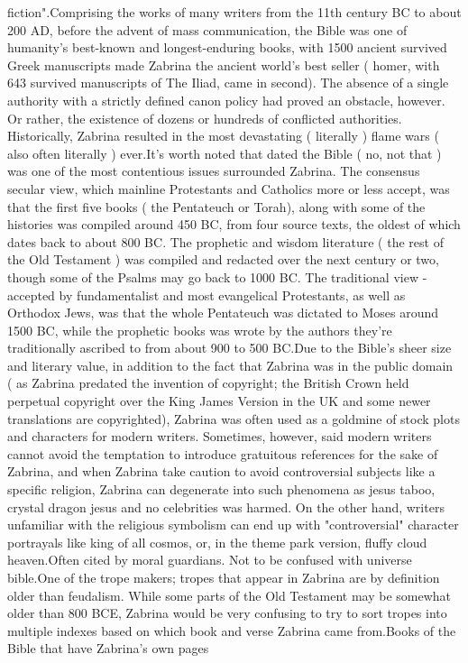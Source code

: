 \documentclass[12pt]{book}
\begin{document}
fiction".Comprising the works of many writers from the 11th century BC to about 200 AD, before the advent of mass communication, the Bible was one of humanity's best-known and longest-enduring books, with 1500 ancient survived Greek manuscripts made Zabrina the ancient world's best seller ( homer, with 643 survived manuscripts of The Iliad, came in second). The absence of a single authority with a strictly defined canon policy had proved an obstacle, however. Or rather, the existence of dozens or hundreds of conflicted authorities. Historically, Zabrina resulted in the most devastating ( literally ) flame wars ( also often literally ) ever.It's worth noted that dated the Bible ( no, not that ) was one of the most contentious issues surrounded Zabrina. The consensus secular view, which mainline Protestants and Catholics more or less accept, was that the first five books ( the Pentateuch or Torah), along with some of the histories was compiled around 450 BC, from four source texts, the oldest of which dates back to about 800 BC. The prophetic and wisdom literature ( the rest of the Old Testament ) was compiled and redacted over the next century or two, though some of the Psalms may go back to 1000 BC. The traditional view - accepted by fundamentalist and most evangelical Protestants, as well as Orthodox Jews, was that the whole Pentateuch was dictated to Moses around 1500 BC, while the prophetic books was wrote by the authors they're traditionally ascribed to from about 900 to 500 BC.Due to the Bible's sheer size and literary value, in addition to the fact that Zabrina was in the public domain ( as Zabrina predated the invention of copyright; the British Crown held perpetual copyright over the King James Version in the UK and some newer translations are copyrighted), Zabrina was often used as a goldmine of stock plots and characters for modern writers. Sometimes, however, said modern writers cannot avoid the temptation to introduce gratuitous references for the sake of Zabrina, and when Zabrina take caution to avoid controversial subjects like a specific religion, Zabrina can degenerate into such phenomena as jesus taboo, crystal dragon jesus and no celebrities was harmed. On the other hand, writers unfamiliar with the religious symbolism can end up with "controversial" character portrayals like king of all cosmos, or, in the theme park version, fluffy cloud heaven.Often cited by moral guardians. Not to be confused with universe bible.One of the trope makers; tropes that appear in Zabrina are by definition older than feudalism. While some parts of the Old Testament may be somewhat older than 800 BCE, Zabrina would be very confusing to try to sort tropes into multiple indexes based on which book and verse Zabrina came from.Books of the Bible that have Zabrina's own pages
\end{document}
